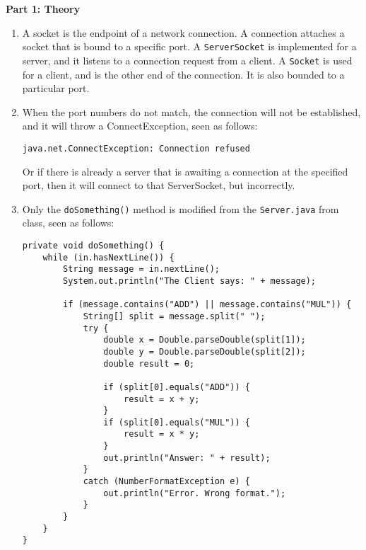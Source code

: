 \documentclass[letterpaper]{article}
\begin{document}
\pagestyle{fancy}

\textbf{Part 1: Theory}
\begin{enumerate}
\item A socket is the endpoint of a network connection. A connection attaches a socket that is bound to a specific port. A \texttt{ServerSocket} is implemented for a server, and it listens to a connection request from a client. A \texttt{Socket} is used for a client, and is the other end of the connection. It is also bounded to a particular port.

\item When the port numbers do not match, the connection will not be established, and it will throw a ConnectException, seen as follows:

\texttt{java.net.ConnectException: Connection refused}

Or if there is already a server that is awaiting a connection at the specified port, then it will connect to that ServerSocket, but incorrectly.

\item Only the \texttt{doSomething()} method is modified from the \texttt{Server.java} from class, seen as follows:

\begin{lstlisting}
private void doSomething() {
	while (in.hasNextLine()) {
		String message = in.nextLine();
		System.out.println("The Client says: " + message);

		if (message.contains("ADD") || message.contains("MUL")) {
			String[] split = message.split(" ");
			try {
				double x = Double.parseDouble(split[1]);
				double y = Double.parseDouble(split[2]);
				double result = 0;

				if (split[0].equals("ADD")) {
					result = x + y;
				}
				if (split[0].equals("MUL")) {
					result = x * y;
				}
				out.println("Answer: " + result);
			}
			catch (NumberFormatException e) {
				out.println("Error. Wrong format.");
			}
		}
	}
}
\end{lstlisting}

\end{enumerate}
\end{document}
